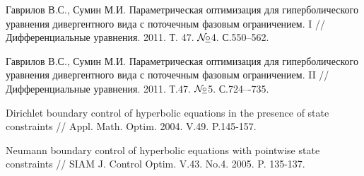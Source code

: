 \documentclass{report}
\newcommand{\No}{${\cal N}{\!}\underline{\circ}$}
\begin{document}
\begin{thebibliography}{99}
Гаврилов В.С., Сумин М.И. Параметрическая оптимизация для гиперболического уравнения дивергентного вида с поточечным фазовым ограничением. I //
Дифференциальные уравнения. 2011. Т. 47. \No4. С.550–562.

Гаврилов В.С., Сумин М.И. Параметрическая оптимизация для гиперболического уравнения дивергентного вида с поточечным фазовым ограничением. II //
Дифференциальные уравнения. 2011. Т.47. \No5. С.724–-735.

 Dirichlet boundary control of hyperbolic equations in the presence of state constraints // Appl.  Math.  Optim.  2004.  V.49.  P.145-157.

 Neumann boundary control of hyperbolic equations with pointwise state constraints // SIAM J. Control Optim. V.43. No.4. 2005.  P. 135-137.

\end{thebibliography}
\end{document}
